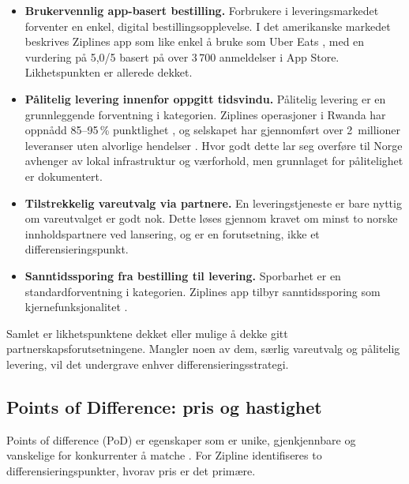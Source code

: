 \documentclass[12pt, a4paper]{article}
\begin{document}
\begin{itemize}[leftmargin=2em]
  \item \textbf{Brukervennlig app-basert bestilling.}
    Forbrukere i leveringsmarkedet forventer en enkel, digital
    bestillingsopplevelse. I det amerikanske markedet beskrives Ziplines app
    som like enkel å bruke som Uber Eats \parencite{stevens2025}, med en
    vurdering på 5,0/5 basert på over 3\,700 anmeldelser i App Store.
    Likhetspunkten er allerede dekket.

  \item \textbf{Pålitelig levering innenfor oppgitt tidsvindu.}
    Pålitelig levering er en grunnleggende forventning i kategorien. Ziplines
    operasjoner i Rwanda har oppnådd 85–95\,\% punktlighet
    \parencite{logisticsnavigators2026}, og selskapet har gjennomført over
    2~millioner leveranser uten alvorlige hendelser \parencite{dronexl2026}.
    Hvor godt dette lar seg overføre til Norge avhenger av lokal
    infrastruktur og værforhold, men grunnlaget for pålitelighet er
    dokumentert.

  \item \textbf{Tilstrekkelig vareutvalg via partnere.}
    En leveringstjeneste er bare nyttig om vareutvalget er godt nok. Dette
    løses gjennom kravet om minst to norske innholdspartnere ved lansering,
    og er en forutsetning, ikke et differensieringspunkt.

  \item \textbf{Sanntidssporing fra bestilling til levering.}
    Sporbarhet er en standardforventning i kategorien. Ziplines app tilbyr
    sanntidssporing som kjernefunksjonalitet \parencite{stevens2025}.
\end{itemize}

Samlet er likhetspunktene dekket eller mulige å dekke gitt
partnerskapsforutsetningene. Mangler noen av dem, særlig vareutvalg og
pålitelig levering, vil det undergrave enhver differensieringsstrategi.

\subsection{Points of Difference: pris og hastighet}

Points of difference (PoD) er egenskaper som er unike, gjenkjennbare og
vanskelige for konkurrenter å matche \parencite[304]{keller2013}. For Zipline
identifiseres to differensieringspunkter, hvorav pris er det primære.
\end{document}
